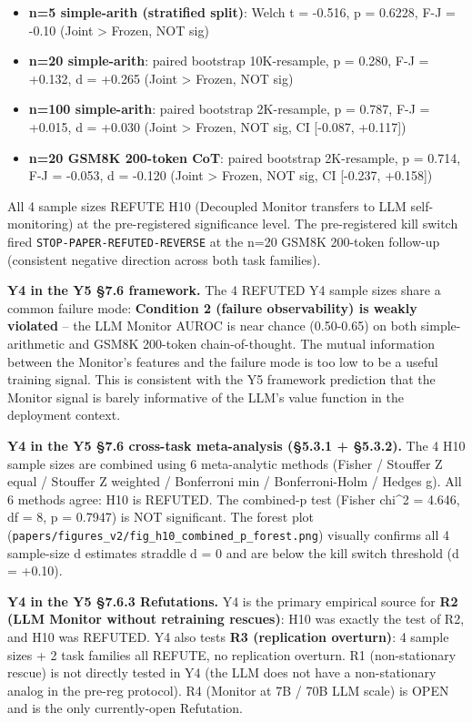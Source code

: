 \documentclass[
]{article}
\providecommand{\tightlist}{%
  \setlength{\itemsep}{0pt}\setlength{\parskip}{0pt}}
\begin{document}
\begin{itemize}
\tightlist
\item
  \textbf{n=5 simple-arith (stratified split)}: Welch t = -0.516, p =
  0.6228, F-J = -0.10 (Joint \textgreater{} Frozen, NOT sig)
\item
  \textbf{n=20 simple-arith}: paired bootstrap 10K-resample, p = 0.280,
  F-J = +0.132, d = +0.265 (Joint \textgreater{} Frozen, NOT sig)
\item
  \textbf{n=100 simple-arith}: paired bootstrap 2K-resample, p = 0.787,
  F-J = +0.015, d = +0.030 (Joint \textgreater{} Frozen, NOT sig, CI
  {[}-0.087, +0.117{]})
\item
  \textbf{n=20 GSM8K 200-token CoT}: paired bootstrap 2K-resample, p =
  0.714, F-J = -0.053, d = -0.120 (Joint \textgreater{} Frozen, NOT sig,
  CI {[}-0.237, +0.158{]})
\end{itemize}

All 4 sample sizes REFUTE H10 (Decoupled Monitor transfers to LLM
self-monitoring) at the pre-registered significance level. The
pre-registered kill switch fired \texttt{STOP-PAPER-REFUTED-REVERSE} at
the n=20 GSM8K 200-token follow-up (consistent negative direction across
both task families).

\textbf{Y4 in the Y5 §7.6 framework.} The 4 REFUTED Y4 sample sizes
share a common failure mode: \textbf{Condition 2 (failure observability)
is weakly violated} -- the LLM Monitor AUROC is near chance (0.50-0.65)
on both simple-arithmetic and GSM8K 200-token chain-of-thought. The
mutual information between the Monitor's features and the failure mode
is too low to be a useful training signal. This is consistent with the
Y5 framework prediction that the Monitor signal is barely informative of
the LLM's value function in the deployment context.

\textbf{Y4 in the Y5 §7.6 cross-task meta-analysis (§5.3.1 + §5.3.2).}
The 4 H10 sample sizes are combined using 6 meta-analytic methods
(Fisher / Stouffer Z equal / Stouffer Z weighted / Bonferroni min /
Bonferroni-Holm / Hedges g). All 6 methods agree: H10 is REFUTED. The
combined-p test (Fisher chi\^{}2 = 4.646, df = 8, p = 0.7947) is NOT
significant. The forest plot
(\texttt{papers/figures\_v2/fig\_h10\_combined\_p\_forest.png}) visually
confirms all 4 sample-size d estimates straddle d = 0 and are below the
kill switch threshold (d = +0.10).

\textbf{Y4 in the Y5 §7.6.3 Refutations.} Y4 is the primary empirical
source for \textbf{R2 (LLM Monitor without retraining rescues)}: H10 was
exactly the test of R2, and H10 was REFUTED. Y4 also tests \textbf{R3
(replication overturn)}: 4 sample sizes + 2 task families all REFUTE, no
replication overturn. R1 (non-stationary rescue) is not directly tested
in Y4 (the LLM does not have a non-stationary analog in the pre-reg
protocol). R4 (Monitor at 7B / 70B LLM scale) is OPEN and is the only
currently-open Refutation.
\end{document}
